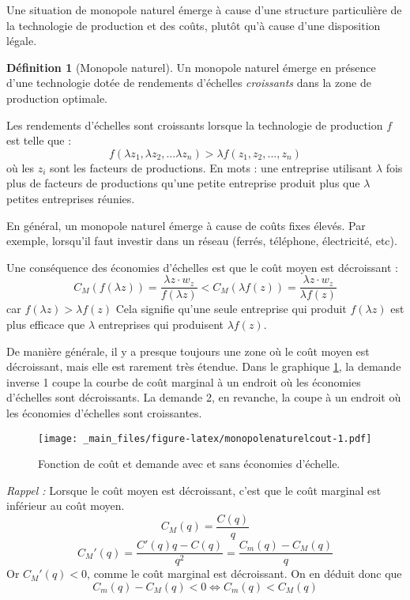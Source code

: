 \documentclass[
]{book}
\theoremstyle{definition}
\newtheorem{definition}{Définition}[chapter]
\theoremstyle{definition}
\theoremstyle{definition}
\theoremstyle{definition}
\theoremstyle{remark}
\begin{document}
Une situation de monopole naturel émerge à cause d'une structure particulière de la technologie de production et des coûts, plutôt qu'à cause d'une disposition légale.

\begin{definition}[Monopole naturel]
Un monopole naturel émerge en présence d'une technologie dotée de rendements d'échelles \emph{croissants} dans la zone de production optimale.
\end{definition}

Les rendements d'échelles sont croissants lorsque la technologie de production \(f\) est telle que :
\[
f(\lambda z_1, \lambda z_2, ...\lambda z_n) > \lambda f(z_1,z_2, ..., z_n)
\]
où les \(z_i\) sont les facteurs de productions.
En mots : une entreprise utilisant \(\lambda\) fois plus de facteurs de productions qu'une petite entreprise produit plus que \(\lambda\) petites entreprises réunies.

En général, un monopole naturel émerge à cause de coûts fixes élevés.
Par exemple, lorsqu'il faut investir dans un réseau (ferrés, téléphone, électricité, etc).

Une conséquence des économies d'échelles est que le coût moyen est décroissant :
\[
C_M(f(\lambda z)) =\frac{\lambda z\cdot w_z}{f(\lambda z)} < C_M(\lambda f(z)) = \frac{\lambda z\cdot w_z}{\lambda f(z)}
\]
car \(f(\lambda z)>\lambda f(z)\)
Cela signifie qu'une seule entreprise qui produit \(f(\lambda z)\) est plus efficace que \(\lambda\) entreprises qui produisent \(\lambda f(z)\).

De manière générale, il y a presque toujours une zone où le coût moyen est décroissant, mais elle est rarement très étendue.
Dans le graphique \ref{fig:monopolenaturelcout}, la demande inverse 1 coupe la courbe de coût marginal à un endroit où les économies d'échelles sont décroissants.
La demande 2, en revanche, la coupe à un endroit où les économies d'échelles sont croissantes.

\begin{figure}
\centering
\texttt{[image: \_main\_files/figure-latex/monopolenaturelcout-1.pdf]}
\caption{\label{fig:monopolenaturelcout}Fonction de coût et demande avec et sans économies d'échelle.}
\end{figure}

\emph{Rappel :} Lorsque le coût moyen est décroissant, c'est que le coût marginal est inférieur au coût moyen.
\[
C_M(q) = \frac{C(q)}{q}
\]
\[
C_M'(q) =\frac{C'(q)q-C(q)}{q^2} = \frac{C_m(q)-C_M(q)}{q}
\]
Or \(C_M'(q)<0\), comme le coût marginal est décroissant.
On en déduit donc que
\[
C_m(q)-C_M(q)< 0 \Leftrightarrow C_m(q)<C_M(q)
\]
\end{document}
